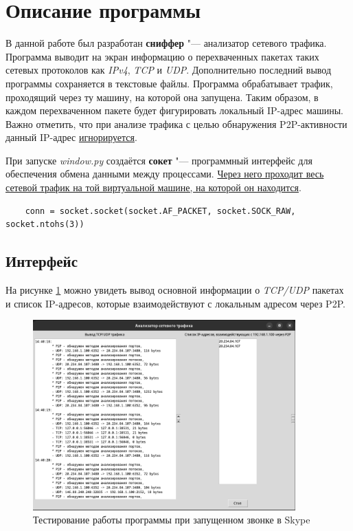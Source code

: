 \documentclass[bachelor, och, coursework]{SCWorks}
\begin{document}
\section{Описание программы}
В данной работе был разработан \textbf{сниффер} "--- анализатор сетевого трафика. 
Программа выводит на экран информацию о перехваченных пакетах таких сетевых протоколов как \textit{IPv4}, \textit{TCP} и \textit{UDP}. 
Дополнительно последний вывод программы сохраняется в текстовые файлы. Программа обрабатывает трафик, проходящий через ту машину, на которой
она запущена. Таким образом, в каждом перехваченном пакете будет фигурировать локальный IP-адрес машины. Важно отметить, что при анализе трафика
с целью обнаружения P2P-активности данный IP-адрес \underline{игнорируется}.

При запуске \textit{window.py} создаётся \textbf{сокет} "--- программный интерфейс для обеспечения обмена данными между процессами. 
\underline{Через него проходит весь} \\ \underline{сетевой трафик на той виртуальной машине, на которой он находится}. %

\begin{verbatim}
    conn = socket.socket(socket.AF_PACKET, socket.SOCK_RAW, socket.ntohs(3))
\end{verbatim}

\subsection{Интерфейс}
На рисунке \ref{ris:test} можно увидеть вывод основной информации о \textit{TCP/UDP} пакетах и 
список IP-адресов, которые взаимодействуют с локальным адресом через P2P.
\begin{figure}[H]
    \centering
    \includegraphics[width=0.9\textwidth]{test2.png}
    \caption{Тестирование работы программы при запущенном звонке в Skype}
    \label{ris:test}
\end{figure}
\end{document}
